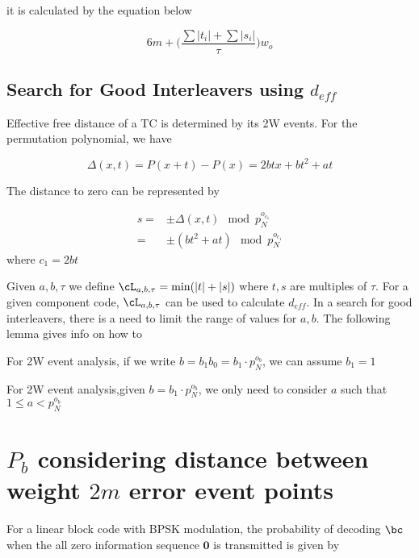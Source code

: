 \documentclass[11pt, oneside, dvipdfmx]{book}
\begin{document}
it is calculated by the equation below 

\begin{equation}
6m +\Bigg( \frac{\sum |t_i| + \sum |s_i|}{\tau} \Bigg) w_o
\end{equation}

\section{Search for Good Interleavers using $d_{eff}$}
Effective free distance of a TC is determined by its 2W events. For the permutation polynomial, we have 

\begin{equation}
\Delta(x,t) = P(x+t) -P(x) = 2btx +bt^2+at
\end{equation}

The distance to zero can be represented by

\begin{equation}
\begin{split}
s =& \pm \Delta(x,t) \mod p_N^{o_{c_1}}\\
=&\pm (bt^2 +at) \mod p_N^{o_{c_1}}
\end{split}
\end{equation}
where $c_1 = 2bt$

Given $a,b,\tau$ we define $\cL_{a,b,\tau} = \min(|t|+|s|)$ where $t,s$ are multiples of $\tau$. For a given component code, $\cL_{a,b,\tau}$ can be used to calculate $d_{eff}$. In a search for good interleavers, there is a need to limit the range of values for $a,b$. The following lemma gives info on how to

\begin{lemma}
For 2W event analysis, if we write $b=b_1b_0=b_1\cdot p_N^{o_b}$, we can assume $b_1=1$
\end{lemma}

\begin{lemma}
For 2W event analysis,given $b=b_1\cdot p_N^{o_b}$, we only need to consider $a$ such that  $1 \leq a < p_N^{o_b}$
\end{lemma}

\chapter{$P_b$ considering distance between weight $2m$ error event points}

For a linear block code with BPSK modulation, the probability of decoding $\bc$ when the all zero information sequence $\mathbf{0}$ is transmitted is given by
\end{document}
